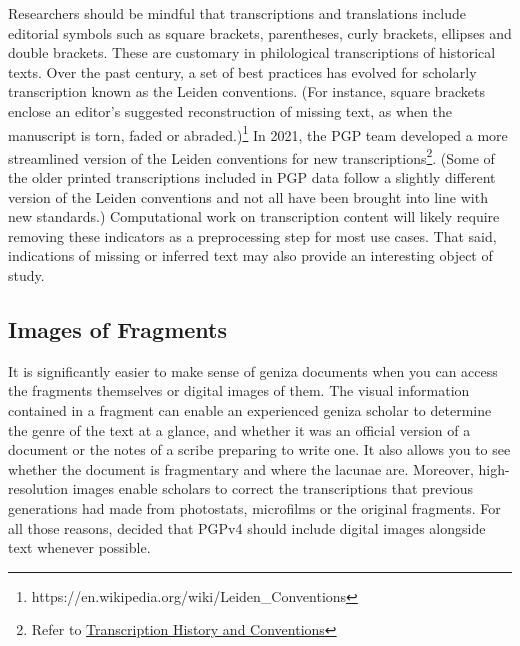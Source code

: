 \documentclass{article}
\begin{document}
Researchers should be mindful that transcriptions and translations include editorial symbols such as square brackets, parentheses, curly brackets, ellipses and double brackets. These are customary in philological transcriptions of historical texts. Over the past century, a set of best practices has evolved for scholarly transcription known as the Leiden conventions. (For instance, square brackets enclose an editor’s suggested reconstruction of missing text, as when the manuscript is torn, faded or abraded.)\footnote{https://en.wikipedia.org/wiki/Leiden\_Conventions} In 2021, the PGP team developed a more streamlined version of the Leiden conventions for new transcriptions\footnote{Refer to \href{https://docs.google.com/document/d/e/2PACX-1vR8kR4zZdnDZXjoLrYrABZn58PRyzrKfEiixQzE9vAzNfzI4Enxs0jU9KO5rTdiH1ZMTPwfqm31mFuX/pub}{Transcription History and Conventions}}. (Some of the older printed transcriptions included in PGP data follow a slightly different version of the Leiden conventions and not all have been brought into line with new standards.) Computational work on transcription content will likely require removing these indicators as a preprocessing step for most use cases. That said, indications of missing or inferred text may also provide an interesting object of study.

\subsection{Images of Fragments}

It is significantly easier to make sense of geniza documents when you can access the fragments themselves or digital images of them. The visual information contained in a fragment can enable an experienced geniza scholar to determine the genre of the text at a glance, and whether it was an official version of a document or the notes of a scribe preparing to write one. It also allows you to see whether the document is fragmentary and where the lacunae are. Moreover, high-resolution images enable scholars to correct the transcriptions that previous generations had made from photostats, microfilms or the original fragments. For all those reasons,  decided that PGPv4 should include digital images alongside text whenever possible. 
\end{document}
